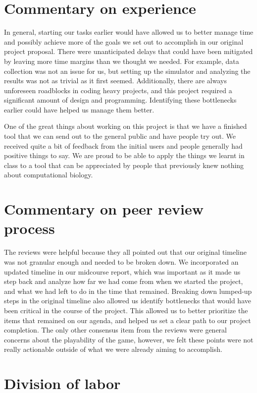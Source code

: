 \documentclass[12pt]{article}
\begin{document}
\section*{Commentary on experience}

In general, starting our tasks earlier would have allowed us to better manage time and possibly achieve more of the goals we set out to accomplish in our original project proposal.
There were unanticipated delays that could have been mitigated by leaving more time margins than we thought we needed. For example, data collection was not an issue for us, but
setting up the simulator and analyzing the results was not as trivial as it first seemed. Additionally, there are always unforeseen roadblocks in coding heavy projects, and this project
required a significant amount of design and programming. Identifying these bottlenecks earlier could have helped us manage them better.

One of the great things about working on this project is that we have a finished tool that we can  send out to the general public and have people try out. We received quite a bit of feedback from the initial users and people generally had positive things to say. We are proud to be able to apply the things we learnt in class to a tool that can be appreciated by people that previously knew nothing about computational biology.

\section*{Commentary on peer review process}

The reviews were helpful because they all pointed out that our original timeline was not granular enough and needed to be broken down. We incorporated an updated timeline in our midcourse
report, which was important as it made us step back and analyze how far we had come from when we started the project, and what we had left to do in the time that remained. Breaking down lumped-up steps in the original timeline also allowed us identify bottlenecks that would have been critical in the course of the project. This
allowed us to better prioritize the items that remained on our agenda, and helped us set a clear path to our project completion. The only other consensus item from the reviews were general
concerns about the playability of the game, however, we felt these points were not really actionable outside of what we were already aiming to accomplish.

\section*{Division of labor}
\end{document}
